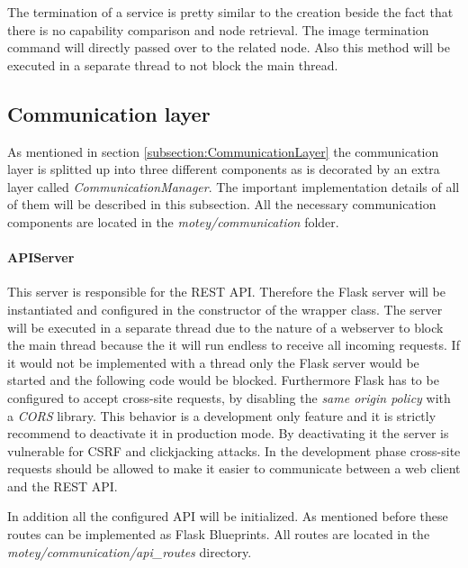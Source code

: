 The termination of a service is pretty similar to the creation beside the fact that there is no capability comparison and node retrieval.
The image termination command will directly passed over to the related node.
Also this method will be executed in a separate thread to not block the main thread.

\subsection{Communication layer}
\label{subsection:implementation-communication-layer}
As mentioned in section \ref{subsection:CommunicationLayer} the communication layer is splitted up into three different components as is decorated by an extra layer called \textit{CommunicationManager}.
The important implementation details of all of them will be described in this subsection.
All the necessary communication components are located in the \textit{motey/communication} folder.

\paragraph{APIServer} This server is responsible for the \ac{REST} \ac{API}.
Therefore the Flask server will be instantiated and configured in the constructor of the wrapper class.
The server will be executed in a separate thread due to the nature of a webserver to block the main thread because the it will run endless to receive all incoming requests.
If it would not be implemented with a thread only the Flask server would be started and the following code would be blocked.
Furthermore Flask has to be configured to accept cross-site requests, by disabling the \textit{same origin policy} with a \textit{\ac{CORS}} library.
This behavior is a development only feature and it is strictly recommend to deactivate it in production mode.
By deactivating it the server is vulnerable for \ac{CSRF} and clickjacking attacks.
In the development phase cross-site requests should be allowed to make it easier to communicate between a web client and the \ac{REST} \ac{API}.

In addition all the configured \ac{API} will be initialized.
As mentioned before these routes can be implemented as Flask Blueprints.
All routes are located in the \textit{motey/communication/api\_routes} directory.

